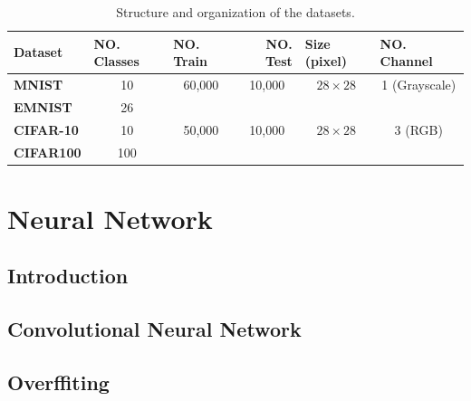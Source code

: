 \begin{table}[]
  \label{dataset_table}
  \begin{tabular}{
      l |
      c
      c
      c
      c
      c}
    \hline
    {\textbf{Dataset}}  & \multicolumn{1}{l}{{\textbf{NO. Classes}}} & \multicolumn{1}{l}{{\textbf{NO. Train}}} & \multicolumn{1}{r}{{\textbf{NO. Test}}} & \multicolumn{1}{l}{{\textbf{Size (pixel)}}} & \multicolumn{1}{l}{{\textbf{NO. Channel}}} \\ \hline
    {\textbf{MNIST}}    & 10                                         & 60,000                                   & 10,000                                  & $28\times28$                                & 1 (Grayscale)                              \\
    {\textbf{EMNIST}}   & 26                                         &                                          &                                         &                                             &                                            \\
    {\textbf{CIFAR-10}}  & 10                                         & 50,000                                         & 10,000                            &  $28\times28$                               &  3 (RGB)                                            \\
    {\textbf{CIFAR100}} & 100                                        &                                          &                                         &                                             &                                            \\ \hline
  \end{tabular}
  \caption{Structure and organization of the datasets.}
\end{table}


\chapter{Neural Network}
\section{Introduction}
\section{Convolutional Neural Network}
\section{Overffiting}


